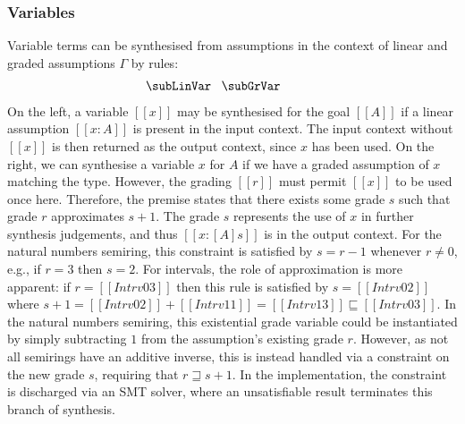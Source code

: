   \subsubsection{Variables}
Variable terms can be synthesised from assumptions in the context of linear and
graded assumptions $\Gamma$ by rules:
  \begin{align*}
    \label{sub:grVar}
    \begin{array}{c}
  \hspace{-3em}\subLinVar
  \;\;\;
  \subGrVar
    \end{array}
  \end{align*}
%
On the left, a variable $[[x]]$ may be synthesised for the goal
$[[ A ]]$ if a linear assumption $[[ x : A ]]$ is present
  in the input context. The input context without $[[x]]$ is then returned as
  the output context, since $x$ has been used. On the right,
  we can synthesise a variable $x$ for $A$ if we have a graded
  assumption of $x$ matching the type. However, %
  the grading $[[ r ]]$ must permit $[[ x ]]$ to be used once here. Therefore,
  the premise states that there exists some grade $s$ such that grade $r$
  approximates $s + 1$. The grade $s$ represents the use of $x$ in further
  synthesis judgements, and thus $[[ x : [ A ] s ]]$ is in the output context.
  For the natural numbers semiring, this constraint is satisfied by $s = r - 1$
  whenever $r \neq 0$, e.g., if $r = 3$ then $s = 2$. For intervals, the role of
  approximation is more apparent: if $r = [[ Intrv 0 3]]$ then this rule is
  satisfied by $s = [[ Intrv 0 2 ]]$ where $s + 1 = [[ Intrv 0 2 ]] + [[ Intrv 1
  1 ]] = [[ Intrv 1 3 ]] \sqsubseteq [[ Intrv 0 3 ]]$. In the natural numbers
  semiring, this existential grade variable could be instantiated by simply
  subtracting $1$ from the assumption's existing grade $r$. However, as not all
  semirings have an additive inverse, this is instead handled via a constraint
  on the new grade $s$, requiring that $ r \sqsupseteq s + 1 $. In the
  implementation, the constraint is discharged via an SMT solver, where an
  unsatisfiable result terminates this branch of synthesis.

